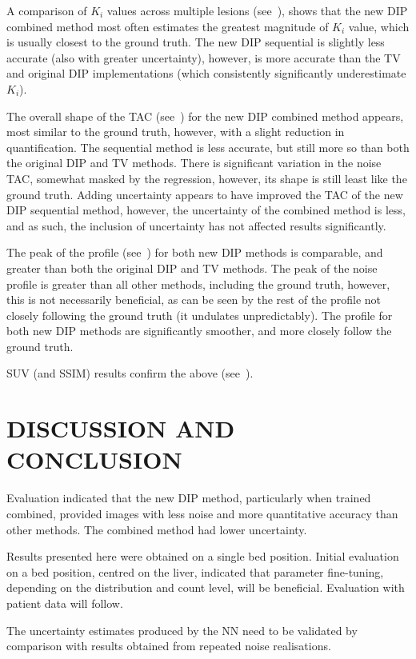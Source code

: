     A comparison of $K_i$ values across multiple lesions (see~), shows that the new \gls{DIP} combined method most often estimates the greatest magnitude of $K_i$ value, which is usually closest to the ground truth. The new \gls{DIP} sequential is slightly less accurate (also with greater uncertainty), however, is more accurate than the \gls{TV} and original \gls{DIP} implementations (which consistently significantly underestimate $K_i$).
    
    The overall shape of the \gls{TAC} (see~) for the new \gls{DIP} combined method appears, most similar to the ground truth, however, with a slight reduction in quantification. The sequential method is less accurate, but still more so than both the original \gls{DIP} and \gls{TV} methods. There is significant variation in the noise \gls{TAC}, somewhat masked by the regression, however, its shape is still least like the ground truth. Adding uncertainty appears to have improved the \gls{TAC} of the new \gls{DIP} sequential method, however, the uncertainty of the combined method is less, and as such, the inclusion of uncertainty has not affected results significantly.
    
    The peak of the profile (see~) for both new \gls{DIP} methods is comparable, and greater than both the original \gls{DIP} and \gls{TV} methods. The peak of the noise profile is greater than all other methods, including the ground truth, however, this is not necessarily beneficial, as can be seen by the rest of the profile not closely following the ground truth (it undulates unpredictably). The profile for both new \gls{DIP} methods are significantly smoother, and more closely follow the ground truth.
     
    \acrshort{SUV} (and \acrshort{SSIM}) results confirm the above (see~).


\section{DISCUSSION AND CONCLUSION} \label{sec:discussion_and_conclusion}

    Evaluation indicated that the new \gls{DIP} method, particularly when trained combined, provided images with less noise and more quantitative accuracy than other methods. The combined method had lower uncertainty.

    Results presented here were obtained on a single bed position. Initial evaluation on a bed position, centred on the liver, indicated that parameter fine-tuning, depending on the distribution and count level, will be beneficial. Evaluation with patient data will follow.
    
    The uncertainty estimates produced by the \gls{NN} need to be validated by comparison with results obtained from repeated noise realisations.
    
